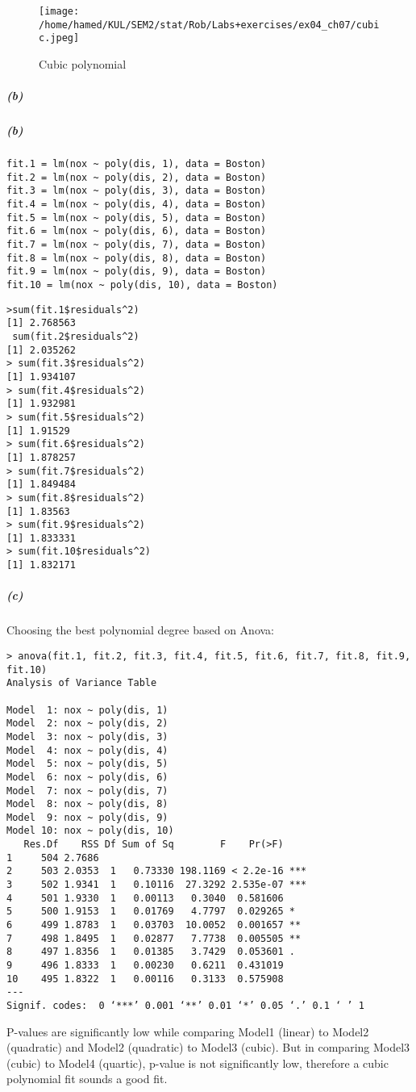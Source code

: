 \documentclass[11pt]{article}
\begin{document}
\begin{figure}[H]
\centering
\texttt{[image: /home/hamed/KUL/SEM2/stat/Rob/Labs+exercises/ex04\_ch07/cubic.jpeg]}
\caption{Cubic polynomial}
\end{figure}

\subparagraph{(b)}
\subparagraph{(b)}
\begin{lstlisting}
fit.1 = lm(nox ~ poly(dis, 1), data = Boston)
fit.2 = lm(nox ~ poly(dis, 2), data = Boston)
fit.3 = lm(nox ~ poly(dis, 3), data = Boston)
fit.4 = lm(nox ~ poly(dis, 4), data = Boston)
fit.5 = lm(nox ~ poly(dis, 5), data = Boston)
fit.6 = lm(nox ~ poly(dis, 6), data = Boston)
fit.7 = lm(nox ~ poly(dis, 7), data = Boston)
fit.8 = lm(nox ~ poly(dis, 8), data = Boston)
fit.9 = lm(nox ~ poly(dis, 9), data = Boston)
fit.10 = lm(nox ~ poly(dis, 10), data = Boston)
\end{lstlisting}

\begin{lstlisting}[basicstyle = \ttfamily\footnotesize]
>sum(fit.1$residuals^2)
[1] 2.768563
 sum(fit.2$residuals^2)
[1] 2.035262
> sum(fit.3$residuals^2)
[1] 1.934107
> sum(fit.4$residuals^2)
[1] 1.932981
> sum(fit.5$residuals^2)
[1] 1.91529
> sum(fit.6$residuals^2)
[1] 1.878257
> sum(fit.7$residuals^2)
[1] 1.849484
> sum(fit.8$residuals^2)
[1] 1.83563
> sum(fit.9$residuals^2)
[1] 1.833331
> sum(fit.10$residuals^2)
[1] 1.832171
\end{lstlisting}

\subparagraph{(c)}
Choosing the best polynomial degree based on Anova:

\begin{lstlisting}[basicstyle = \ttfamily\footnotesize]
> anova(fit.1, fit.2, fit.3, fit.4, fit.5, fit.6, fit.7, fit.8, fit.9, fit.10)
Analysis of Variance Table

Model  1: nox ~ poly(dis, 1)
Model  2: nox ~ poly(dis, 2)
Model  3: nox ~ poly(dis, 3)
Model  4: nox ~ poly(dis, 4)
Model  5: nox ~ poly(dis, 5)
Model  6: nox ~ poly(dis, 6)
Model  7: nox ~ poly(dis, 7)
Model  8: nox ~ poly(dis, 8)
Model  9: nox ~ poly(dis, 9)
Model 10: nox ~ poly(dis, 10)
   Res.Df    RSS Df Sum of Sq        F    Pr(>F)    
1     504 2.7686                                    
2     503 2.0353  1   0.73330 198.1169 < 2.2e-16 ***
3     502 1.9341  1   0.10116  27.3292 2.535e-07 ***
4     501 1.9330  1   0.00113   0.3040  0.581606    
5     500 1.9153  1   0.01769   4.7797  0.029265 *  
6     499 1.8783  1   0.03703  10.0052  0.001657 ** 
7     498 1.8495  1   0.02877   7.7738  0.005505 ** 
8     497 1.8356  1   0.01385   3.7429  0.053601 .  
9     496 1.8333  1   0.00230   0.6211  0.431019    
10    495 1.8322  1   0.00116   0.3133  0.575908    
---
Signif. codes:  0 ‘***’ 0.001 ‘**’ 0.01 ‘*’ 0.05 ‘.’ 0.1 ‘ ’ 1
\end{lstlisting}
P-values are significantly low while comparing Model1 (linear) to Model2 (quadratic) and Model2 (quadratic) to Model3 (cubic). But in comparing Model3 (cubic) to Model4 (quartic), p-value is not significantly low, therefore a cubic polynomial fit sounds a good fit.
\end{document}
